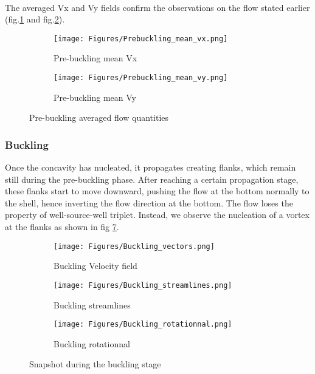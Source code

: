 \documentclass[a4paper,10pt]{report}
\begin{document}
\paragraph{}
The averaged Vx and Vy fields confirm the observations on the flow stated earlier (fig.\ref{fig:PreBucklingVx} and fig.\ref{fig:PreBucklingVy}).
\begin{figure}[htbp]%
	\centering%
	 \begin{subfigure}[t]{0.5\textwidth}%
        \texttt{[image: Figures/Prebuckling\_mean\_vx.png]}%
        \caption{Pre-buckling mean Vx}%
				\label{fig:PreBucklingVx}%
    \end{subfigure}%
    \begin{subfigure}[t]{0.5\textwidth}%
        \texttt{[image: Figures/Prebuckling\_mean\_vy.png]}%
        \caption{Pre-buckling mean Vy}%
        \label{fig:PreBucklingVy}%
    \end{subfigure}%
		\caption{Pre-buckling averaged flow quantities}%
		\label{fig:PreBucklingAveragedquantities}%
\end{figure}

\newpage
\subsubsection{Buckling}
Once the concavity has nucleated, it propagates creating flanks, which remain still during the pre-buckling phase. After reaching a certain propagation stage, these flanks start to move downward, pushing the flow at the bottom normally to the shell, hence inverting the flow direction at the bottom. The flow loses the property of well-source-well triplet. Instead, we observe the nucleation of a vortex at the flanks as shown in fig \ref{fig:Snapshotduringthebucklingstage}.
\begin{figure}[htbp]%
	\centering%
	 \begin{subfigure}[t]{0.5\textwidth}%
        \texttt{[image: Figures/Buckling\_vectors.png]}%
        \caption{Buckling Velocity field}%
				\label{fig:BucklingVelocityfield}%
    \end{subfigure}%
    \begin{subfigure}[t]{0.5\textwidth}%
        \texttt{[image: Figures/Buckling\_streamlines.png]}%
        \caption{Buckling streamlines}%
        \label{fig:Bucklingstreamlines}%
    \end{subfigure}%
		
		\begin{subfigure}[t]{0.5\textwidth}%
        \texttt{[image: Figures/Buckling\_rotationnal.png]}%
        \caption{Buckling rotationnal}%
        \label{fig:BucklingRotationnal}%
    \end{subfigure}%
		\caption{Snapshot during the buckling stage}%
		\label{fig:Snapshotduringthebucklingstage}%
\end{figure}
\end{document}

